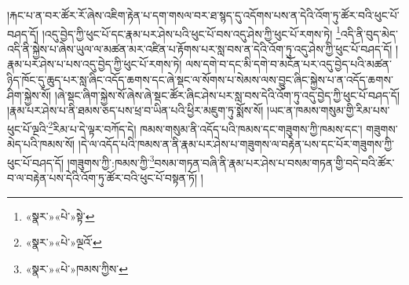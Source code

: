 །རྐང་པ་ན་བར་ཚོར་རོ་ཞེས་འཇིག་རྟེན་པ་དག་གསལ་བར་ཐ་སྙད་དུ་འདོགས་པས་ན་དེའི་འོག་ཏུ་ཚོར་བའི་ཕུང་པོ་བཤད་དོ། །འདུ་བྱེད་ཀྱི་ཕུང་པོ་དང་རྣམ་པར་ཤེས་པའི་ཕུང་པོ་བས་འདུ་ཤེས་ཀྱི་ཕུང་པོ་རགས་ཏེ། \footnote{«སྣར་»«པེ་»སྟེ་}འདི་ནི་བུད་མེད་འདི་ནི་སྐྱེས་པ་ཞེས་ཡུལ་ལ་མཚན་མར་འཛིན་པ་རྟོགས་པར་སླ་བས་ན་དེའི་འོག་ཏུ་འདུ་ཤེས་ཀྱི་ཕུང་པོ་བཤད་དོ། །རྣམ་པར་ཤེས་པ་པས་འདུ་བྱེད་ཀྱི་ཕུང་པོ་རགས་ཏེ། ལས་དགེ་བ་དང་མི་དགེ་བ་མངོན་པར་འདུ་བྱེད་པའི་མཚན་ཉིད་ཁོང་དུ་ཆུད་པར་སླ་ཞིང་འདོད་ཆགས་དང་ཞེ་སྡང་ལ་སོགས་པ་སེམས་ལས་བྱུང་ཞིང་སྐྱེས་པ་ན་འདོད་ཆགས་ཤིག་སྐྱེས་སོ། །ཞེ་སྡང་ཞིག་སྐྱེས་སོ་ཞེས་ཞེ་སྡང་ཚོར་ཞིང་ཤེས་པར་སླ་བས་དེའི་འོག་ཏུ་འདུ་བྱེད་ཀྱི་ཕུང་པོ་བཤད་དོ། །རྣམ་པར་ཤེས་པ་ནི་ཐམས་ཅད་པས་ཕྲ་བ་ཡིན་པའི་ཕྱིར་མཇུག་ཏུ་སྨོས་སོ། །ཡང་ན་ཁམས་གསུམ་གྱི་རིམ་པས་ཕུང་པོ་ལྔའི་\footnote{«སྣར་»«པེ་»ལྔའོ་}རིམ་པ་དེ་ལྟར་བཀོད་དེ། ཁམས་གསུམ་ནི་འདོད་པའི་ཁམས་དང་གཟུགས་ཀྱི་ཁམས་དང་། གཟུགས་མེད་པའི་ཁམས་སོ། །དེ་ལ་འདོད་པའི་ཁམས་ན་ནི་རྣམ་པར་ཤེས་པ་གཟུགས་ལ་བརྟེན་པས་དང་པོར་གཟུགས་ཀྱི་ཕུང་པོ་བཤད་དོ། །གཟུགས་ཀྱི་:ཁམས་ཀྱི་\footnote{«སྣར་»«པེ་»ཁམས་ཀྱིས་}བསམ་གཏན་བཞི་ནི་རྣམ་པར་ཤེས་པ་བསམ་གཏན་གྱི་བདེ་བའི་ཚོར་བ་ལ་བརྟེན་པས་དེའི་འོག་ཏུ་ཚོར་བའི་ཕུང་པོ་བསྟན་ཏོ། །
